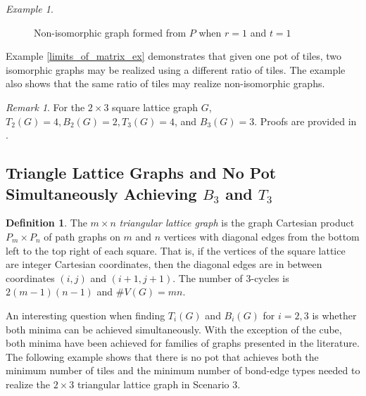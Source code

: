 \documentclass{elsarticle}
\theoremstyle{definition}
\newtheorem{definition}[theorem]{Definition}
\theoremstyle{remark}
\newtheorem{remark}[theorem]{Remark}
\newtheorem{example}[theorem]{Example}
\theoremstyle{plain}
\theoremstyle{plain}
\begin{document}
\begin{example}
\begin{figure}[h!]
        \caption{Non-isomorphic graph formed from $P$ when $r=1$ and $t=1$} \label{fig:2x3latticenonisom} \end{figure}

\end{example}

Example \ref{limits_of_matrix_ex} demonstrates that given one pot of tiles, two isomorphic graphs may be realized using a different ratio of tiles. The example also shows that the same ratio of tiles may realize non-isomorphic graphs. 
\begin{remark} For the $2 \times 3$ square lattice graph $G$, $T_2(G)=4, B_2(G)=2, T_3(G) = 4$, and $B_3(G) = 3$. Proofs are provided in \cite{repository}.  \end{remark}


\subsection{Triangle Lattice Graphs and No Pot Simultaneously Achieving $B_3$ and $T_3$ } \label{sec:trianglelattice}
\begin{definition} The $m \times n$ \emph{triangular lattice graph} is the graph Cartesian product $P_m \times P_n$ of path graphs on $m$ and $n$ vertices with diagonal edges from the bottom left to the top right of each square. That is, if the vertices of the square lattice are integer Cartesian coordinates, then the diagonal edges are in between coordinates $(i,j)$ and $(i+1, j+1)$. The number of 3-cycles is $2(m-1)(n-1)$ and $\#V(G) = mn$. %
\end{definition}

 An interesting question when finding $T_i(G)$ and $B_i(G)$ for $i= 2, 3$ is whether both minima can be achieved simultaneously. With the exception of the cube, both minima have been achieved for families of graphs presented in the literature. The following example shows that there is no pot that achieves both the minimum number of tiles and the minimum number of bond-edge types needed to realize the $2 \times 3$ triangular lattice graph in Scenario 3.
 
\end{document}
